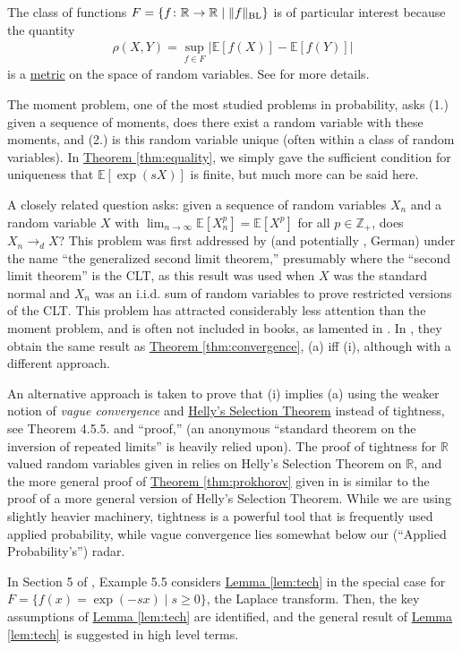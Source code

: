 \documentclass{article}
\theoremstyle{definition}
\newcommand{\E}{\mathbb E}
\newcommand{\1}{\mathbb I}
\newcommand{\Z}{\mathbb Z}
\newcommand{\R}{\mathbb R}
\newcommand{\BL}{\mathop{\text{\rm BL}}}
\newcommand{\thmhref}[1]{\hyperref[#1]{Theorem \ref{#1}}}
\newcommand{\lemhref}[1]{\hyperref[#1]{Lemma \ref{#1}}}
\begin{document}
The class of functions $F = \{f \colon \R \to \R \mid \|f\|_{\BL}\}$
is of particular interest because the quantity
\begin{align*}
  \rho(X,Y) = \sup_{f \in F} |\E[f(X)] - \E[f(Y)]|
\end{align*}
is a \href{http://en.wikipedia.org/wiki/Metric_(mathematics)#Definition}{metric} on the space of random variables.  See
\cite{dudley2002real} for more details.

The moment problem, one
of the most studied problems in probability, asks (1.) given a sequence of moments, does there
exist a random variable with these moments, and (2.) is this random
variable unique (often within a class of random variables).  In
\thmhref{thm:equality}, we simply gave the sufficient condition for
uniqueness that $\E[\exp(sX)]$ is finite, but much more can be said
here.

A closely related question asks: given a sequence of random variables
$X_n$ and a random variable $X$ with $\lim_{n \to \infty} \E[X_n^p] =
\E[X^p]$ for all $p \in \Z_+$, does $X_n \to_d X$?  This problem was
first addressed by \cite{frechet1931proof} (and potentially
\cite{wintner1928konvergenzbegriff}, German) under the name ``the
generalized second limit theorem,'' presumably where the ``second
limit theorem'' is the CLT, as this result was used when $X$ was the
standard normal and $X_n$ was an i.i.d. sum of random variables to
prove restricted versions of the CLT.  This problem has attracted
considerably less attention than the moment problem, and is often not
included in books, as lamented in \cite{rao1950generalized}.  In  \cite{rao1950generalized},
they obtain the same result as \thmhref{thm:convergence}, (a) iff (i),
although with a different approach.


An alternative approach is taken \cite{chung2000course} to prove that
(i) implies (a) using the weaker notion of \emph{vague convergence}
and
\href{http://www.math.ust.hk/~makchen/Math541/Chap2Sec1.pdf}{Helly's
  Selection Theorem} instead of tightness, see Theorem 4.5.5. and
``proof,'' (an anonymous ``standard theorem on the inversion of
repeated limits'' is heavily relied upon).  The proof of tightness for
$\R$ valued random variables given in
\cite{billingsley2012probability} relies on Helly's Selection Theorem
on $\R$, and the more general proof of \thmhref{thm:prokhorov} given
in \cite{billingsley2009convergence} is similar to the proof of a more
general version of Helly's Selection Theorem.  While we are using
slightly heavier machinery, tightness is a powerful tool that is frequently
used applied probability, while vague convergence lies somewhat below
our (``Applied Probability's'') radar.

In Section 5 of \cite{billingsley2009convergence}, Example 5.5
considers \lemhref{lem:tech} in the special case for $F = \{f(x) =
\exp(-sx)\mid s \geq 0\}$, the Laplace transform. Then, the key
assumptions of \lemhref{lem:tech} are identified, and the general
result of \lemhref{lem:tech} is suggested in high level terms.



{}

\end{document}
